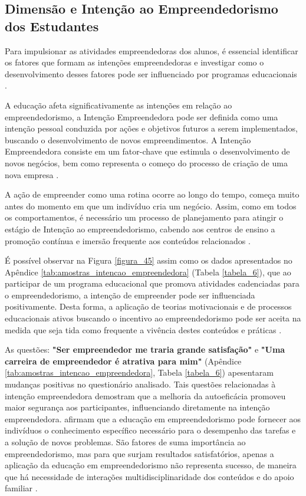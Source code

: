 \subsection{Dimensão e Intenção ao Empreendedorismo dos Estudantes}

Para impulsionar as atividades empreendedoras dos alunos, é essencial identificar os fatores que formam as intenções empreendedoras e investigar como o desenvolvimento desses fatores pode ser influenciado por programas educacionais \cite{gubik_entrepreneurial_2019}. 

A educação afeta significativamente as intenções em relação ao empreendedorismo, a Intenção Empreendedora pode ser definida como uma intenção pessoal conduzida por ações e objetivos futuros a serem implementados, buscando o desenvolvimento de novos empreendimentos. A Intenção Empreendedora consiste em um fator-chave que estimula o desenvolvimento de novos negócios, bem como representa o começo do processo de criação de uma nova empresa \cite{vasconcellos-guedes_e-surveys_2007}.

A ação de empreender como uma rotina ocorre ao longo do tempo, começa muito antes do momento em que um indivíduo cria um negócio. Assim, como em todos os comportamentos, é necessário um processo de planejamento para atingir o estágio de Intenção ao empreendedorismo, cabendo aos centros de ensino a promoção contínua e imersão frequente aos conteúdos relacionados \cite{garcia-rodriguez_entrepreneurial_2017}.

É possível observar na Figura \ref{figura_45} assim como os dados apresentados no Apêndice \ref{tab:amostras_intencao_empreendedora} (Tabela \ref{tabela_6}), que ao participar de um programa educacional que promova atividades cadenciadas para o empreendedorismo, a intenção de empreender pode ser influenciada positivamente. Desta forma, a aplicação de teorias motivacionais e de processos educacionais ativos buscando o incentivo ao empreendedorismo pode ser aceita na medida que seja tida como frequente a vivência destes conteúdos e práticas \cite{fayolle_beyond_2014}.

As questões: \textbf{"Ser empreendedor me traria grande satisfação"} e \textbf{"Uma carreira de empreendedor é atrativa para mim"} (Apêndice \ref{tab:amostras_intencao_empreendedora}, Tabela \ref{tabela_6}) apesentaram mudanças positivas no questionário analisado. Tais questões relacionadas à intenção empreendedora demostram que a melhoria da autoeficácia promoveu maior segurança aos participantes, influenciando diretamente na intenção empreendedora.  afirmam que a educação em empreendedorismo pode fornecer aos indivíduos o conhecimento específico necessário para o desempenho das tarefas e a solução de novos problemas. São fatores de suma importância ao empreendedorismo, mas para que surjam resultados satisfatórios, apenas a aplicação da educação em empreendedorismo não representa sucesso, de maneira que há necessidade de interações multidisciplinaridade dos conteúdos e do apoio familiar \cite{edelman_impact_2016}. 


